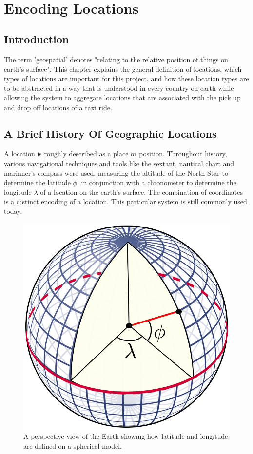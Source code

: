 \graphicspath{{Chapter2/Figs/Vector/}{Chapter2/Figs/}}

%
\chapter{Encoding Locations}
\section{Introduction}
The term 'geospatial' denotes "relating to the relative position of things on earth's surface". This chapter explains the general definition of locations, which types of locations are important for this project, and how these location types are to be abstracted in a way that is understood in every country on earth while allowing the system to aggregate locations that are associated with the pick up and drop off locations of a taxi ride.

%
\section{A Brief History Of Geographic Locations}
A location is roughly described as a place or position. Throughout history, various navigational techniques and tools like the sextant, nautical chart and marinner's compass were used, measuring the altitude of the North Star to determine the latitude $\phi$, in conjunction with a chronometer to determine the longitude $\lambda$ of a location on the earth's surface. The combination of coordinates is a distinct encoding of a location. This particular system is still commonly used today.

\begin{figure}[htbp!]
	\centering
	\includegraphics[width=.2\textwidth]{LatLngSphere}
	\caption[LatLngSphere]{A perspective view of the Earth showing how latitude and longitude are defined on a spherical model.}
	\label{fig:latlngsphere}
\end{figure}

